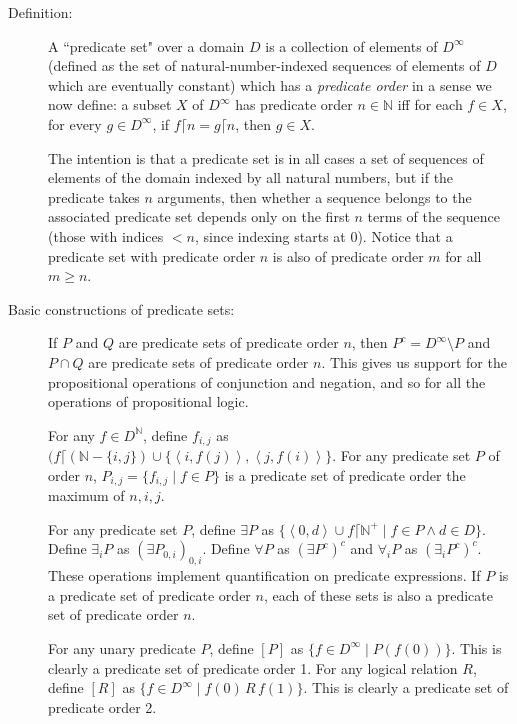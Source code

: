 \documentclass[12pt]{book}
\begin{document}
\begin{description}

\item[Definition:]  A ``predicate set" over a domain $D$ is a collection of elements of $D^{\infty}$ (defined as the set of  natural-number-indexed sequences of elements of $D$ which are eventually constant) which has a {\em predicate order\/} in a sense we now define:  a subset $X$ of $D^{\infty}$ has predicate order $n\in \mathbb N$ iff for each $f \in X$, for every $g \in D^{\infty}$, if $f \lceil n = g \lceil n$, then $g \in X$.

The intention is that a predicate set is in all cases a set of sequences of elements of the domain indexed by all natural numbers, but if the predicate takes $n$ arguments, then whether a sequence belongs to the associated predicate set depends only on the first $n$ terms of the sequence (those with indices $<n$, since indexing starts at 0).  Notice that a predicate set with predicate order $n$ is also of predicate order $m$ for all $m \geq n$.

\item[Basic constructions of predicate sets:]   If $P$ and $Q$ are predicate sets of predicate order $n$, then $P^c = D^{\infty} \setminus P$ and $P \cap Q$ are predicate sets of predicate order $n$.  This gives us support for the propositional operations of conjunction and negation, and so for all the operations of propositional logic.

For any $f \in D^{\mathbb N}$, define $f_{i,j}$ as $(f \lceil ({\mathbb N}-\{i,j\}) \cup \{\left<i,f(j)\right>,\left<j,f(i)\right>\}$.  For any predicate set $P$ of order $n$,
$P_{i,j} = \{f_{i,j} \mid f \in P\}$ is a predicate set of predicate order the maximum of $n,i,j$.

For any predicate set $P$, define $\exists P$ as $\{\left<0,d\right> \cup f \lceil {\mathbb N}^+\mid f \in P \wedge d \in D\}$.  Define $\exists_i P$ as $(\exists P_{0,i})_{0,i}$.  Define $\forall P$
as $(\exists P^c)^c$ and $\forall _iP$
as $(\exists_i P^c)^c$.  These operations implement quantification on predicate expressions.  If $P$ is a predicate set of predicate order $n$, each of these sets is also a predicate set of predicate order $n$.

For any unary predicate $P$, define $[P]$ as $\{f \in D^{\infty} \mid P(f(0))\}$.  This is clearly a predicate set of predicate order 1.  For any logical relation $R$, define $[R]$ as
$\{f \in D^{\infty} \mid f(0) \, R \, f(1)\}$.  This is clearly a predicate set of predicate order 2.


\end{description}
\end{document}

